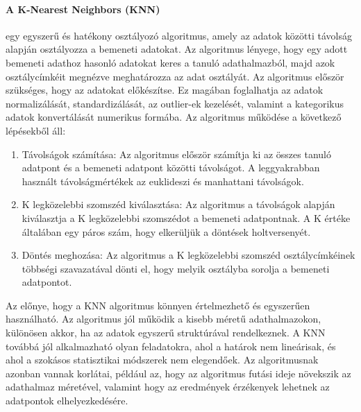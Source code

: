 \documentclass[12pt,a4paper]{article}
\begin{document}
\paragraph{A K-Nearest Neighbors (KNN)} egy egyszerű és hatékony osztályozó algoritmus, amely az adatok közötti távolság alapján osztályozza a bemeneti adatokat. Az algoritmus lényege, hogy egy adott bemeneti adathoz hasonló adatokat keres a tanuló adathalmazból, majd azok osztálycímkéit megnézve meghatározza az adat osztályát.
Az algoritmus először szükséges, hogy az adatokat előkészítse. Ez magában foglalhatja az adatok normalizálását, standardizálását, az outlier-ek kezelését, valamint a kategorikus adatok konvertálását numerikus formába.
Az algoritmus működése a következő lépésekből áll:
\begin{enumerate}
    \item Távolságok számítása: Az algoritmus először számítja ki az összes tanuló adatpont és a bemeneti adatpont közötti távolságot. A leggyakrabban használt távolságmértékek az euklideszi és manhattani távolságok.
    \item K legközelebbi szomszéd kiválasztása: Az algoritmus a távolságok alapján kiválasztja a K legközelebbi szomszédot a bemeneti adatpontnak. A K értéke általában egy páros szám, hogy elkerüljük a döntések holtversenyét.
    \item Döntés meghozása: Az algoritmus a K legközelebbi szomszéd osztálycímkéinek többségi szavazatával dönti el, hogy melyik osztályba sorolja a bemeneti adatpontot.
\end{enumerate}
Az előnye, hogy a KNN algoritmus könnyen értelmezhető és egyszerűen használható. Az algoritmus jól működik a kisebb méretű adathalmazokon, különösen akkor, ha az adatok egyszerű struktúrával rendelkeznek. A KNN továbbá jól alkalmazható olyan feladatokra, ahol a határok nem lineárisak, és ahol a szokásos statisztikai módszerek nem elegendőek. Az algoritmusnak azonban vannak korlátai, például az, hogy az algoritmus futási ideje növekszik az adathalmaz méretével, valamint hogy az eredmények érzékenyek lehetnek az adatpontok elhelyezkedésére.
\end{document}
